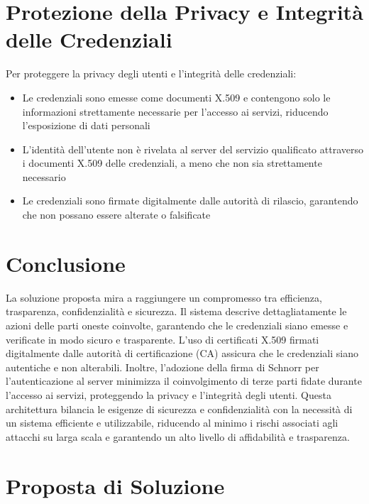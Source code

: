     
    \section{Protezione della Privacy e Integrità delle Credenziali}
        Per proteggere la privacy degli utenti e l'integrità delle credenziali:
        \begin{itemize}
            \item Le credenziali sono emesse come documenti X.509 e contengono solo le informazioni strettamente necessarie per l'accesso ai servizi, riducendo l'esposizione di dati personali
                
             \item L'identità dell'utente non è rivelata al server del servizio qualificato attraverso i documenti X.509 delle credenziali, a meno che non sia strettamente necessario
                
             \item Le credenziali sono firmate digitalmente dalle autorità di rilascio, garantendo che non possano essere alterate o falsificate
        \end{itemize}
    
    
    \section{Conclusione}
        La soluzione proposta mira a raggiungere un compromesso tra efficienza, trasparenza, confidenzialità e sicurezza.
        Il sistema descrive dettagliatamente le azioni delle parti oneste coinvolte, garantendo che le credenziali siano emesse e verificate in modo sicuro e trasparente.
        L'uso di certificati X.509 firmati digitalmente dalle autorità di certificazione (CA) assicura che le credenziali siano autentiche e non alterabili.
        Inoltre, l'adozione della firma di Schnorr per l'autenticazione al server minimizza il coinvolgimento di terze parti fidate durante l'accesso ai servizi, proteggendo la privacy e l'integrità degli utenti.
        Questa architettura bilancia le esigenze di sicurezza e confidenzialità con la necessità di un sistema efficiente e utilizzabile, riducendo al minimo i rischi associati agli attacchi su larga scala e garantendo un alto livello di affidabilità e trasparenza.
    

    \section{Proposta di Soluzione}

